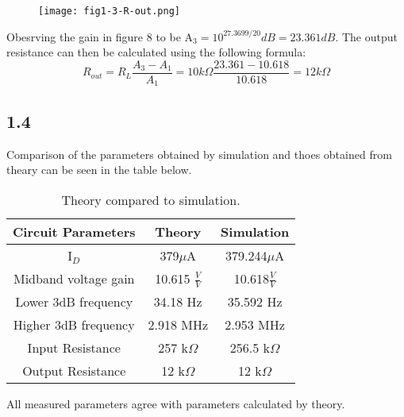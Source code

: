   \begin{figure}[h!]
        \centering
        \texttt{[image: fig1-3-R-out.png]}
  \end{figure}

Obesrving the gain in figure 8 to be A$_3 = 10^{27.3699/20} dB = 23.361 dB$. The output resistance can then be calculated using the following formula: $$R_{out} = R_L\frac{A_3 - A_1}{A_1} = 10k\Omega \frac{23.361-10.618}{10.618} = 12 k\Omega$$

\pagebreak
\subsection*{1.4}

  Comparison of the parameters obtained by simulation and thoes obtained from theary can be seen in the table below.\\

  \begin{table}[htbp]
     \centering
       \begin{tabular}{ c | c | c }
        \hline
         Circuit Parameters     &   Theory                  & Simulation \\
       \hline
        I$_D$                   &   379$\mu$A               &   379.244$\mu$A\\
        Midband voltage gain    &   10.615 $\frac{V}{V}$    &   10.618$\frac{V}{V}$\\
        Lower 3dB frequency     &   34.18 Hz                &   35.592 Hz\\
        Higher 3dB frequency    &   2.918 MHz               &   2.953 MHz\\
        Input Resistance        &   257 k$\Omega$           &   256.5 k$\Omega$\\
        Output Resistance       &   12 k$\Omega$            &   12 k$\Omega$\\
       \end{tabular}%
     \caption{Theory compared to simulation.}
     \label{tab:addlabel}%
    \end{table}%
  
  All measured parameters agree with parameters calculated by theory.